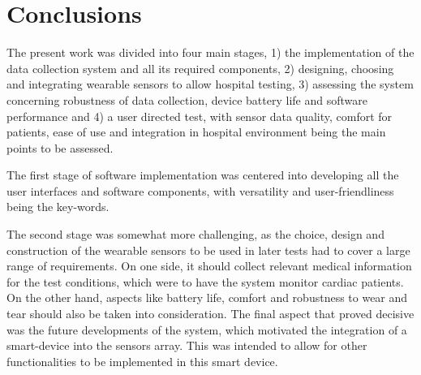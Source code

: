 
\chapter{Conclusions}
\label{chapter:conclusions}

The present work was divided into four main stages, 1) the implementation of the data collection system and all its required components, 2) designing, choosing and integrating wearable sensors to allow hospital testing, 3) assessing the system concerning robustness of data collection, device battery life and software performance and 4) a user directed test, with sensor data quality, comfort for patients, ease of use and integration in hospital environment being the main points to be assessed.

The first stage of software implementation was centered into developing all the user interfaces and software components, with versatility and user-friendliness being the key-words.

The second stage was somewhat more challenging, as the choice, design and construction of the wearable sensors to be used in later tests had to cover a large range of requirements. On one side, it should collect relevant medical information for the test conditions, which were to have the system monitor cardiac patients. On the other hand, aspects like battery life, comfort and robustness to wear and tear should also be taken into consideration. The final aspect that proved decisive was the future developments of the system, which motivated the integration of a smart-device into the sensors array. This was intended to allow for other functionalities to be implemented in this smart device.

